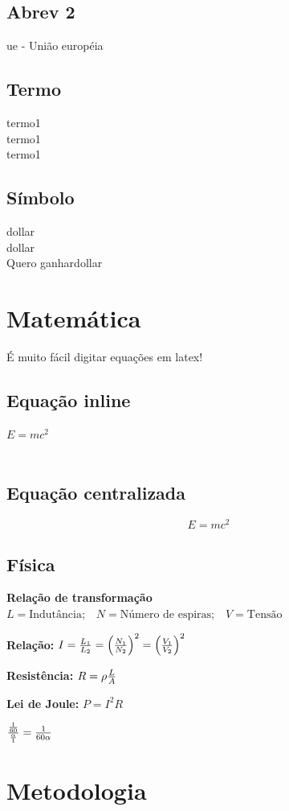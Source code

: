 \documentclass[12pt,a4paper,oneside,brazil]{abntex2}
\begin{document}
\section{Abrev 2}
\gls{ue} - União européia

\section{Termo}
\gls{termo1}\\
\gls{termo1}\\
\acrshort{termo1}

\section{Símbolo}
\gls{dollar}\\
\gls{dollar} \\
Quero ganhar\acrshort{dollar}

\chapter{Matemática}
É muito fácil digitar equações em latex!\\
\lipsum[1][1-12]
\section{Equação inline}
$E=mc^2$\\\\
\lipsum[12][1-33]
\section{Equação centralizada}
$$E=mc^2$$

\section{Física}
\textbf{Relação de transformação}
$L=\text{Indutância;}\quad N=\text{Número de espiras;}\quad V=\text{Tensão}$

\textbf{Relação:}
$I=\Large\frac{L_1}{L_2}\normalsize=\left( \Large\frac{N_1}{N_2} \right)^2\normalsize=\left(\Large\frac{V_1}{V_2} \right)^2$

\textbf{Resistência:}
$R=\rho\Large\frac{L}{A}$

\textbf{Lei de Joule:}
$P=I^2R$

$\Large\frac{\frac{1}{60}}{\frac{\alpha}{1}}\normalsize=\Large\frac{1}{60\alpha}$

\chapter{Metodologia}
\lipsum[8-9]
\end{document}
